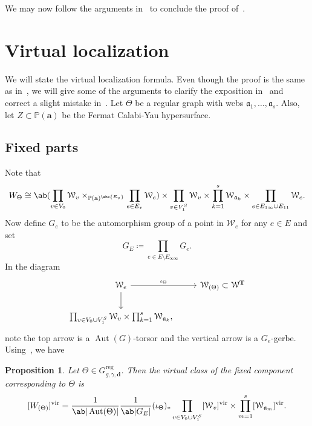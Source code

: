 \documentclass{amsart}
\newtheorem{prop}[thm]{Proposition}
\theoremstyle{definition}
\theoremstyle{remark}
\theoremstyle{plain}
\theoremstyle{definition}
\theoremstyle{remark}
\newcommand{\T}{\mathbf{T}}
\renewcommand{\P}{\mathbb{P}}
\newcommand{\ba}{\mathbf{a}}
\newcommand{\mc}[1]{\mathcal{#1}}
\newcommand{\mf}[1]{\mathfrak{#1}}
\newcommand{\mbf}[1]{\mathbf{#1}}
\newcommand{\mr}[1]{\mathrm{#1}}
\newcommand{\1}{\mathbf{1}}
\newcommand{\2}{\mathbf{2}}
\newcommand{\3}{\mathbf{3}}
\newcommand{\vir}{\mr{vir}}
\DeclareMathOperator{\Aut}{Aut}
\begin{document}
We may now follow the arguments in~\cite{msp3} to conclude the proof of~.

\section{Virtual localization}
\label{sec:Virtual localization}

We will state the virtual localization formula. Even though the proof is the same as in~\cite{msp2,nmsp}, we will give some of the arguments to clarify the exposition in~\cite{nmsp} and correct a slight mistake in~\cite[Lemma 4.4]{msp2}. Let $\Theta$ be a regular graph with webs $\mf{a}_1, \ldots, \mf{a}_s$. Also, let $Z \subset \P(\ba)$ be the Fermat Calabi-Yau hypersurface.

\subsection{Fixed parts}%
\label{sub:Fixed parts}

Note that
\[ W_{\Theta} \cong \ab( \prod_{v \in V_0} \mc{W}_v \times_{\P(\ba)^{\abs{E_v}}} \prod_{e \in E_v}\mc{W}_e ) \times \prod_{v \in V_1^S} \mc{W}_v \times \prod_{k=1}^s \mc{W}_{\mf{a}_k} \times \prod_{e \in E_{1\infty} \cup E_{11}} \mc{W}_e. \]
Now define $G_e$ to be the automorphism group of a point in $\mc{W}_e$ for any $e \in E$ and set
\[ G_E \coloneqq \prod_{e \in E \setminus E_{\infty\infty}} G_e. \]
In the diagram
\begin{equation*}
\begin{tikzcd}
    \mc{W}_e \ar{r}{\iota_{\Theta}} \ar{d} & \mc{W}_{(\Theta)} \subset \mc{W}^{\T} \\
    \prod_{v \in V_0 \cup V_1^S} \mc{W}_v \times \prod_{k=1}^s \mc{W}_{\mf{a}_k},
\end{tikzcd}
\end{equation*}
note the top arrow is a $\Aut(G)$-torsor and the vertical arrow is a $G_e$-gerbe. Using~\cite[Theorem 3.5]{locwccosection}, we have
\begin{prop}
    Let $\Theta \in G_{g,\gamma,\mbf{d}}^{\mr{reg}}$. Then the virtual class of the fixed component corresponding to $\Theta$ is
    \[ [W_{(\Theta)}]^{\vir} = \frac{1}{\ab|\Aut(\Theta)|} \frac{1}{\ab|G_E|} (\iota_{\Theta})_* \prod_{v \in V_0 \cup V_1^S} [\mc{W}_v]^{\vir} \times \prod_{m=1}^s [\mc{W}_{\mf{a}_m}]^{\vir}. \]
\end{prop}
\end{document}

